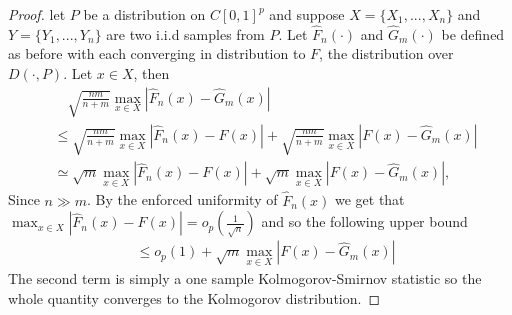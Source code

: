 \documentclass[12pt]{article}
\begin{document}
\begin{proof}
let $P$ be a distribution on $C[0, 1]^p$ and suppose $X = \{X_1,...,X_n\}$ and $Y = \{Y_1,...,Y_n\}$ are two i.i.d samples from $P$. Let $\widehat{F}_n(\cdot)$ and $\widehat{G}_m(\cdot)$ be defined as before with each converging in distribution to $F$, the distribution over $D(\cdot, P)$. Let $x \in X$, then
\begin{align*}
    &\quad \sqrt{\frac{nm}{n+m}} \max_{x \in X}|\widehat{F}_n(x) - \widehat{G}_m(x)| \\
    &\leq \sqrt{\frac{nm}{n+m}} \max_{x \in X}|\widehat{F}_n(x) - F(x)| +  \sqrt{\frac{nm}{n+m}} \max_{x \in X}| F(x) - \widehat{G}_m(x)| \\
    &\simeq \sqrt{m} \max_{x \in X}|\widehat{F}_n(x) - F(x)| +  \sqrt{m} \max_{x \in X}| F(x) - \widehat{G}_m(x)|,
\end{align*}
Since $n \gg m$. By the enforced uniformity of $\widehat{F}_n(x)$ we get that $\max_{x \in X}|\widehat{F}_n(x) - F(x)| = o_p(\frac{1}{\sqrt{n}})$ and so the following upper bound
\begin{align*}
    &\leq o_p(1) +  \sqrt{m} \max_{x \in X}| F(x) - \widehat{G}_m(x)|
\end{align*}
The second term is simply a one sample Kolmogorov-Smirnov statistic so the whole quantity converges to the Kolmogorov distribution.
\end{proof}

\end{document}

